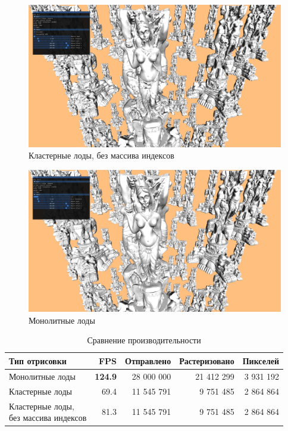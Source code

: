 \begin{figure}[h]
    \centering
    \includegraphics[width=\textwidth]{pics/impl2.png}
    \caption{Кластерные лоды, без массива индексов}
    \label{fig:impl-cluster-2}
\end{figure}

\begin{figure}[h]
    \centering
    \includegraphics[width=\textwidth]{pics/impl3.png}
    \caption{Монолитные лоды}
    \label{fig:impl-mono}
\end{figure}

\begin{table}[h]
    \centering
    \begin{tabular}{lrrrr}
        \hline \hline
        Тип отрисовки
        & FPS
        & Отправлено
        & Растеризовано
        & Пикселей \\ \hline
        Монолитные лоды
        & \textbf{124.9}
        & 28 000 000
        & 21 412 299
        & 3 931 192 \\
        Кластерные лоды
        & 69.4
        & 11 545 791
        & 9 751 485
        & 2 864 864 \\
        \makecell[l]{Кластерные лоды,\\ без массива индексов}
        & 81.3
        & 11 545 791
        & 9 751 485
        & 2 864 864 \\
        \hline \hline
    \end{tabular}

    \caption{Сравнение производительности}
    \label{tab:fps}
\end{table}
